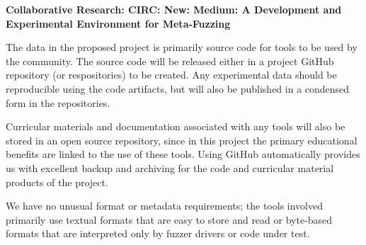 \documentclass[12pt]{article}
\begin{document}

\begin{center}
  {\Large\sf\textbf{Collaborative Research: CIRC: New: Medium: A Development and Experimental Environment for Meta-Fuzzing}}
\end{center}

The data in the proposed project is primarily source code for tools to
be used by the community. The
source code will be released either in a project GitHub repository (or
respositories) to be created. Any experimental data should be reproducible using the code artifacts, but will also be published in a condensed form in the repositories.

Curricular
materials and documentation associated with any tools will also be stored in
an open source repository, since in this project the primary
educational benefits are linked to the use of these tools.  Using GitHub automatically provides us with excellent backup
and archiving for the code and curricular material products of the
project.

We have no unusual format or metadata requirements; the
tools involved primarily use textual formats that are easy to store
and read or byte-based formats that are interpreted only by fuzzer
drivers or code under test.
\end{document}
